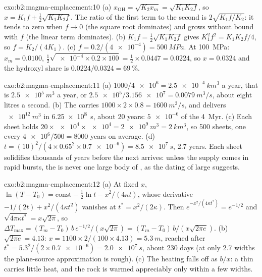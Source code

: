\begin{solution}{exo:b2:magma-emplacement:10}
(a) $x_{\mathrm{OH}} = \sqrt{K_2x_m} = \sqrt{K_1K_2f}$, so $x = K_1f + \frac12\sqrt{K_1K_2f}$.
The ratio of the first term to the second is $2\sqrt{K_1f/K_2}$: it tends to zero
when $f \to 0$ (the square root dominates) and grows without bound with $f$ (the
linear term dominates). (b) $K_1 f = \frac12\sqrt{K_1K_2 f}$ gives $K_1^2f^2 =
K_1K_2f/4$, so $f = K_2/(4K_1)$. (c) $f = 0.2/(\num{4e-4}) = \qty{500}{MPa}$. At
\qty{100}{MPa}: $x_m = 0.0100$, $\frac12\sqrt{\num{e-4}\times0.2\times100} =
\frac12\times0.0447 = 0.0224$, so $x = 0.0324$ and the hydroxyl share is
$0.0224/0.0324 = \qty{69}{\percent}$.
\end{solution}

\begin{solution}{exo:b2:magma-emplacement:11}
(a) $1000/\num{4e6} = \qty{2.5e-4}{km^3}$ a year, that is $\qty{2.5e5}{m^3}$ a year,
or $\num{2.5e5}/\num{3.156e7} = \qty{0.0079}{m^3/s}$, about eight litres a second.
(b) The  carries $1000\times2\times0.8 = \qty{1600}{m^3/s}$, and delivers
$\qty{e12}{m^3}$ in \qty{6.25e8}{s}, about 20 years: $\num{5e-6}$ of the
\qty{4}{Myr}. (c) Each sheet holds $20\times\num{e4}\times\num{e4} = \qty{2e9}{m^3} =
\qty{2}{km^3}$, so 500 sheets, one every $\num{4e6}/500 = 8000$ years on average.
(d) $t = (10)^2/(4\times0.65^2\times\num{0.7e-6}) = \qty{8.5e7}{s}$, 2.7 years. Each
sheet solidifies thousands of years before the next arrives: unless the supply
comes in rapid bursts, the  is never one large body of , as the
dating of large  suggests.
\end{solution}

\begin{solution}{exo:b2:magma-emplacement:12}
(a) At fixed $x$, $\ln(T - T_0) = \text{const} - \frac12\ln t - x^2/(4\kappa t)$, whose
derivative $-1/(2t) + x^2/(4\kappa t^2)$ vanishes at $t^* = x^2/(2\kappa)$. Then
$e^{-x^2/(4\kappa t^*)} = e^{-1/2}$ and $\sqrt{4\pi\kappa t^*} = x\sqrt{2\pi}$, so $\Delta
T_{\max} = (T_m - T_0)\,b\,e^{-1/2}/(x\sqrt{2\pi}) = (T_m - T_0)\,b/(x\sqrt{2\pi e})$. (b)
$\sqrt{2\pi e} = 4.13$: $x = 1100\times2/(100\times4.13) = \qty{5.3}{m}$, reached after
$t^* = 5.3^2/(2\times\num{0.7e-6}) = \qty{2.0e7}{s}$, about 230 days (at only 2.7
 widths the plane-source approximation is rough). (c) The heating falls off
as $b/x$: a thin  carries little heat, and the rock is warmed appreciably
only within a few  widths.
\end{solution}

